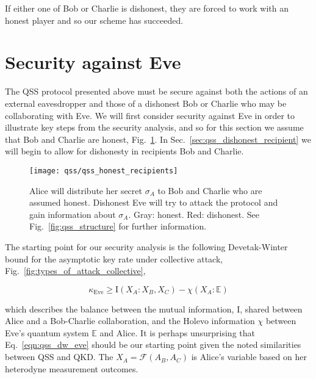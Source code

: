 If either one of Bob or Charlie is dishonest, they are forced to work with an honest player and so our scheme has succeeded.





\section{Security against Eve}\label{sec:qss_honest_recipients}

The QSS protocol presented above must be secure against both the actions of an external eavesdropper and those of a dishonest Bob or Charlie who may be collaborating with Eve. We will first consider security against Eve in order to illustrate key steps from the security analysis, and so for this section we assume that Bob and Charlie are honest,
Fig.~\ref{fig:qss_honest_recipients}. In Sec.~\ref{sec:qss_dishonest_recipient} we will begin to allow for dishonesty in recipients Bob and Charlie.

\begin{figure}[htp]
\centering
\texttt{[image: qss/qss\_honest\_recipients]}
\caption{\label{fig:qss_honest_recipients} Alice will distribute her secret $\sigma_A$ to Bob and Charlie who are assumed honest. Dishonest Eve will try to attack the protocol and gain information about $\sigma_A$. Gray: honest. Red: dishonest. See Fig.~\ref{fig:qss_structure} for further information.}
\end{figure}


The starting point for our security analysis is the following Devetak-Winter bound \cite{Devetak2004} for the asymptotic key rate under collective attack, Fig.~\ref{fig:types_of_attack_collective},


\begin{equation}\label{eqn:qss_dw_eve}
\kappa_{\text{Eve}} \ge \text{I}\left(X_A : X_B, X_C\right) - \chi\left(X_A : \mathbb{E}\right)
\end{equation}

\noindent which describes the balance between the mutual information, $\text{I}$, shared between Alice and a Bob-Charlie collaboration, and the Holevo information $\chi$ between Eve's quantum system $\mathbb{E}$ and Alice. It is perhaps unsurprising that Eq.~\ref{eqn:qss_dw_eve} should be our starting point given the noted similarities between QSS and QKD. The $X_A = \mathcal{F}\left(A_B, A_C\right)$ is Alice's variable based on her heterodyne measurement outcomes.

